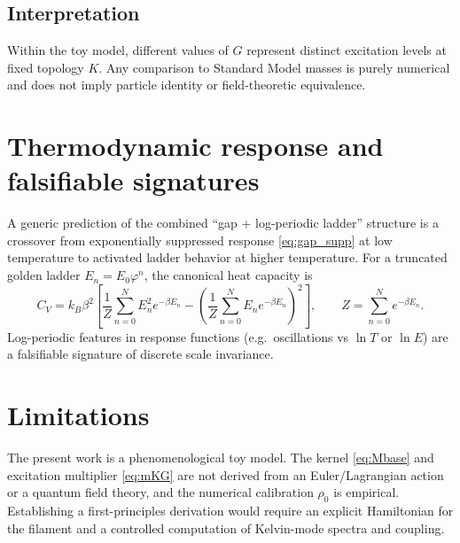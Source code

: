 \documentclass[11pt, a4paper]{article}
\newcommand{\goldenratio}{\varphi}
\begin{document}
\subsection{Interpretation}
Within the toy model, different values of \(G\) represent distinct excitation levels at fixed topology \(K\). Any comparison to Standard Model masses is purely numerical and does not imply particle identity or field-theoretic equivalence.

\section{Thermodynamic response and falsifiable signatures}
\label{sec:predictions}

A generic prediction of the combined ``gap + log-periodic ladder'' structure is a crossover from exponentially suppressed response \eqref{eq:gap_supp} at low temperature to activated ladder behavior at higher temperature.
For a truncated golden ladder \(E_n=E_0\goldenratio^n\), the canonical heat capacity is
\begin{equation}
C_V = k_B \beta^2 \left[ \frac{1}{Z} \sum_{n=0}^N E_n^2 e^{-\beta E_n} - \left( \frac{1}{Z} \sum_{n=0}^N E_n e^{-\beta E_n} \right)^2 \right],
\qquad
Z=\sum_{n=0}^N e^{-\beta E_n}.
\label{eq:CV}
\end{equation}
Log-periodic features in response functions (e.g.\ oscillations vs \(\ln T\) or \(\ln E\)) are a falsifiable signature of discrete scale invariance.

\section{Limitations}
\label{sec:limits}

The present work is a phenomenological toy model. The kernel \eqref{eq:Mbase} and excitation multiplier \eqref{eq:mKG} are not derived from an Euler/Lagrangian action or a quantum field theory, and the numerical calibration \(\rho_0\) is empirical. Establishing a first-principles derivation would require an explicit Hamiltonian for the filament and a controlled computation of Kelvin-mode spectra and coupling.

\end{document}
